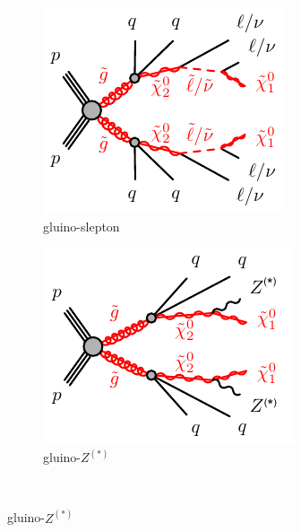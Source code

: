 \begin{figure}[tp]
\centering
\begin{subfigure}{0.48\textwidth}
\centering
\includegraphics[width=\textwidth]{figures/2ljets_strong_gogo_qqqqllllN1N1_N2.pdf}
\caption{gluino-slepton}
\end{subfigure}
\hfill
\begin{subfigure}{0.47\textwidth}
\centering
\includegraphics[width=\textwidth]{figures/2ljets_strong_gogo_qqqqZZN1N1.pdf}
\caption{gluino-$Z^{(*)}$}
\end{subfigure}
\\[0.5em]

\end{figure}
